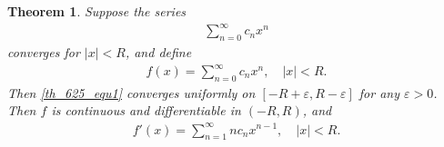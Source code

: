 \documentclass[11pt]{book}
\newtheorem{theorem}{Theorem}[chapter]
\theoremstyle{definition}
\numberwithin{equation}{chapter}
\begin{document}
\begin{theorem}\label{th_625}
Suppose the series
\begin{align}\label{th_625_equ1}
    \sum^\infty_{n=0} c_n x^n
\end{align}
converges for $\left|x\right| < R$, and define
\begin{align}\label{th_625_equ2}
    f(x) = \sum^\infty_{n=0} c_n x^n, \quad \left|x\right| < R.
\end{align}
Then \eqref{th_625_equ1} converges uniformly on $[-R + \varepsilon, R - \varepsilon]$ for any $\varepsilon > 0$. Then $f$ is continuous and differentiable in $(-R,R)$, and
\begin{align}\label{th_625_equ3}
    f'(x) = \sum^\infty_{n=1} n c_n x^{n-1}, \quad \left|x\right| < R.
\end{align}
\end{theorem}
\end{document}
